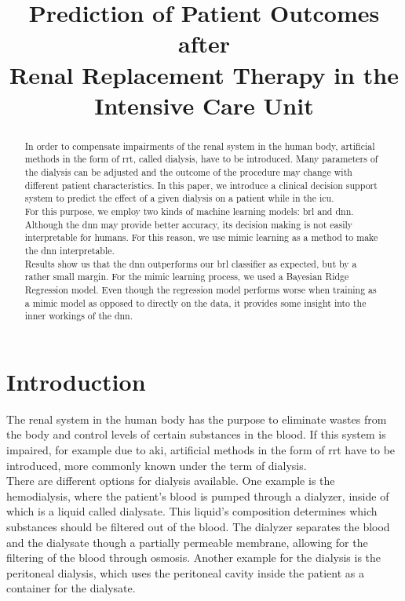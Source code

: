 \documentclass[conference,comsoc]{IEEEtran}
\begin{document}
\title{Prediction of Patient Outcomes after \\Renal Replacement Therapy in the Intensive Care Unit }


\author{
}
\maketitle

\begin{abstract}
In order to compensate impairments of the renal system in the human body, artificial methods in the form of \gls{rrt}, called dialysis, have to be introduced.
Many parameters of the dialysis can be adjusted and the outcome of the procedure may change with different patient characteristics. 
In this paper, we introduce a clinical decision support system to predict the effect of a given dialysis on a patient while in the \gls{icu}. \\
For this purpose, we employ two kinds of machine learning models: \gls{brl} and \gls{dnn}. Although the \gls{dnn} may provide better accuracy, its decision making is not easily interpretable for humans. For this reason, we use mimic learning as a method to make the \gls{dnn} interpretable. \\
Results show us that the \gls{dnn} outperforms our \gls{brl} classifier as expected, but by a rather small margin.
For the mimic learning process, we used a Bayesian Ridge Regression model.
Even though the regression model performs worse when training as a mimic model as opposed to directly on the data, it provides some insight into the inner workings of the \gls{dnn}.
\end{abstract}


\section{Introduction}
The renal system in the human body has the purpose to eliminate wastes from the body and control levels of certain substances in the blood. 
If this system is impaired, for example due to \gls{aki}, artificial methods in the form of \gls{rrt} have to be introduced, more commonly known under the term of dialysis. \\
There are different options for dialysis available.
One example is the hemodialysis, where the patient's blood is pumped through a dialyzer, inside of which is a liquid called dialysate.
This liquid's composition determines which substances should be filtered out of the blood.
The dialyzer separates the blood and the dialysate though a partially permeable membrane, allowing for the filtering of the blood through osmosis.
Another example for the dialysis is the peritoneal dialysis, which uses the peritoneal cavity inside the patient as a container for the dialysate. \\
\end{document}
